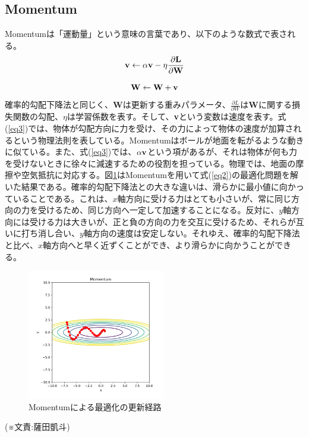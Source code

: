 \subsection{Momentum}
{Momentumは「運動量」という意味の言葉であり、以下のような数式で表される。
\begin{equation}
\label{eq3}
\bf v \leftarrow \alpha v - \eta  \frac{\partial L}{\partial W}
\end{equation}

\begin{equation}
\label{eq4}
\bf W \leftarrow W + v
\end{equation}確率的勾配下降法と同じく、{\bf W}は更新する重みパラメータ、$\displaystyle \frac{\partial L}{\partial W}$は{\bf W}に関する損失関数の勾配、$\displaystyle {\eta}$は学習係数を表す。そして、{\bf v}という変数は速度を表す。式(\ref{eq3})では、物体が勾配方向に力を受け、その力によって物体の速度が加算されるという物理法則を表している。Momentumはボールが地面を転がるような動きに似ている。また、式(\ref{eq3})では、$\displaystyle {\alpha} \bf v$という項があるが、それは物体が何も力を受けないときに徐々に減速するための役割を担っている。物理では、地面の摩擦や空気抵抗に対応する。図\ref{gr3}はMomentumを用いて式(\ref{eq2})の最適化問題を解いた結果である。確率的勾配下降法との大きな違いは、滑らかに最小値に向かっていることである。これは、$\displaystyle x$軸方向に受ける力はとても小さいが、常に同じ方向の力を受けるため、同じ方向へ一定して加速することになる。反対に、$\displaystyle y$軸方向には受ける力は大きいが、正と負の方向の力を交互に受けるため、それらが互いに打ち消し合い、$\displaystyle y$軸方向の速度は安定しない。それゆえ、確率的勾配下降法と比べ、$\displaystyle x$軸方向へと早く近ずくことができ、より滑らかに向かうことができる。
\begin{figure}[H]
\centering
\includegraphics[width=6cm]{./figure/Momentum.png}
\caption{Momentumによる最適化の更新経路 \label{gr3}}
\end{figure}
\begin{flushright}
  (※文責:薩田凱斗)
\end{flushright}
}






